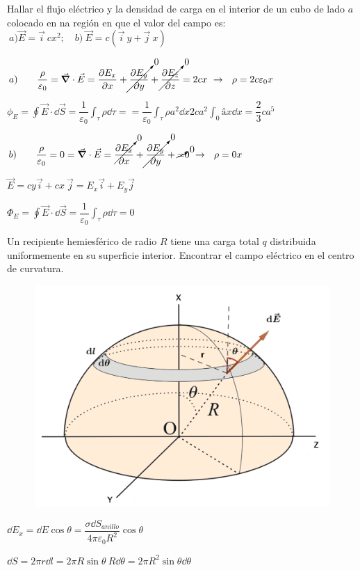 \begin{prob}
Hallar el flujo eléctrico y la densidad de carga	 en el interior de un cubo de lado $a$ colocado en na región en que el valor del campo es: $\ a) \vec E=\vec i\ cx^2; \quad b)\ \vec E=c(\vec i\ y+\vec j \ x)$
\end{prob}

$a)\qquad \displaystyle \dfrac {\rho}{\varepsilon_0}=\vec \grad \cdot \vec E=
\pdv{E_x}{x}+\cancelto{0}{\pdv{E_y}{y}}+\cancelto{0}{\pdv{E_z}{z}}=2cx \ \to \ \ \rho=2c\varepsilon_0 x$

$\phi_E= \displaystyle \oint \vec E \cdot \dd \vec S=\dfrac 1 {\varepsilon_0} \int_\tau \rho \dd \tau= =
\dfrac 1 {\varepsilon_0} \int_\tau \rho a^2 \dd x
 2ca^2 \int_0â x \dd x=\dfrac 2 3 c a^5$
 
 $b) \qquad  
\displaystyle \dfrac {\rho}{\varepsilon_0}=0=\vec \grad \cdot \vec E=
\cancelto{0}{\pdv{E_x}{x}}+\cancelto{0}{\pdv{E_y}{y}}+\cancelto{0} = 0 \ \to \ \ \rho=0 x$

$\vec E=cy \vec i + cx\ \vec j=E_x \vec i + E_y \vec j$

$\Phi_E=\displaystyle \oint \vec E \cdot \dd \vec S =\dfrac 1 {\varepsilon_0} \int_\tau \rho \dd \tau =0$


\begin{prob}
Un recipiente hemiesférico de radio $R$ tiene una carga total $q$	distribuida uniformemente en su superficie interior. Encontrar el campo eléctrico en el centro de curvatura.
\end{prob}

\begin{figure}[H]
	\centering
	\includegraphics[width=.6\textwidth]{imagenes/imagenes23/T23IM15.png}
\end{figure}

$\dd E_x=\dd E \cos \theta = \dfrac {\sigma \dd S_{anillo}}{4\pi \varepsilon_0 R^2}\cos \theta$

$\dd S=2\pi r \dd l =2\pi R \sin \theta \ R\dd \theta=2\pi R^2 \sin \theta \dd \theta$

